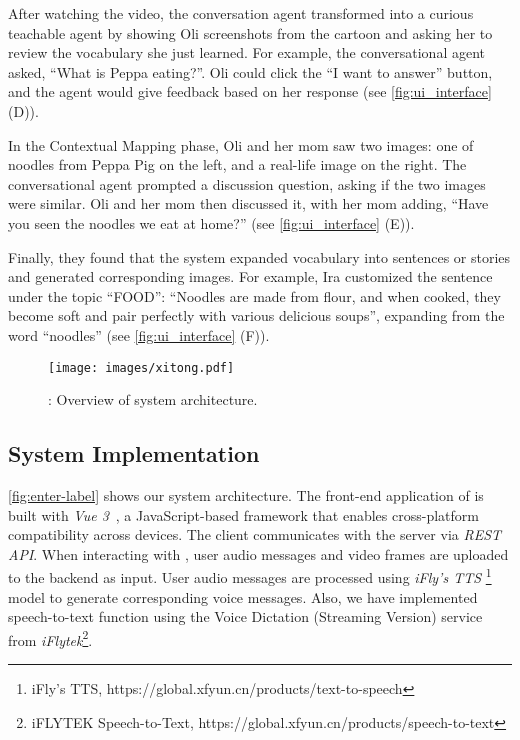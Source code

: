 After watching the video, the conversation agent transformed into a curious teachable agent by showing Oli screenshots from the cartoon and asking her to review the vocabulary she just learned. 
For example, the conversational agent asked, ``What is Peppa eating?''.  Oli could click the ``I want to answer'' button, and the agent would give feedback based on her response (see \autoref{fig:ui_interface} (D)).

In the Contextual Mapping phase, Oli and her mom saw two images: one of noodles from Peppa Pig on the left, and a real-life image on the right. The conversational agent prompted a discussion question, asking if the two images were similar. Oli and her mom then discussed it, with her mom adding, ``Have you seen the noodles we eat at home?'' (see \autoref{fig:ui_interface} (E)).

Finally, they found that the system expanded vocabulary into sentences or stories and generated corresponding images. For example, Ira customized the sentence under the topic ``FOOD'': ``Noodles are made from flour, and when cooked, they become soft and pair perfectly with various delicious soups'', expanding from the word ``noodles'' (see \autoref{fig:ui_interface} (F)).

\begin{figure*}[h]
    \centering
    \texttt{[image: images/xitong.pdf]}
    \caption{: Overview of \name{} system architecture.}
    \label{fig:enter-label}\vspace{-0.5cm}
\end{figure*}

\subsection{ \name{} System Implementation}
\label{subsec:system-implementation}
\autoref{fig:enter-label} shows our system architecture. 
The front-end application of \name{} is built with \textit{Vue 3}~\cite{vue3}, a JavaScript-based framework that enables cross-platform compatibility across devices. The client communicates with the server via \textit{REST API}. When interacting with \name{}, user audio messages and video frames are uploaded to the backend as input. User audio messages are processed using \textit{iFly's TTS}
\footnote{iFly's TTS, https://global.xfyun.cn/products/text-to-speech} model to generate corresponding voice messages. Also, we have implemented speech-to-text function using the Voice Dictation (Streaming Version) service from \textit{iFlytek}\footnote{iFLYTEK Speech-to-Text, https://global.xfyun.cn/products/speech-to-text}. 

